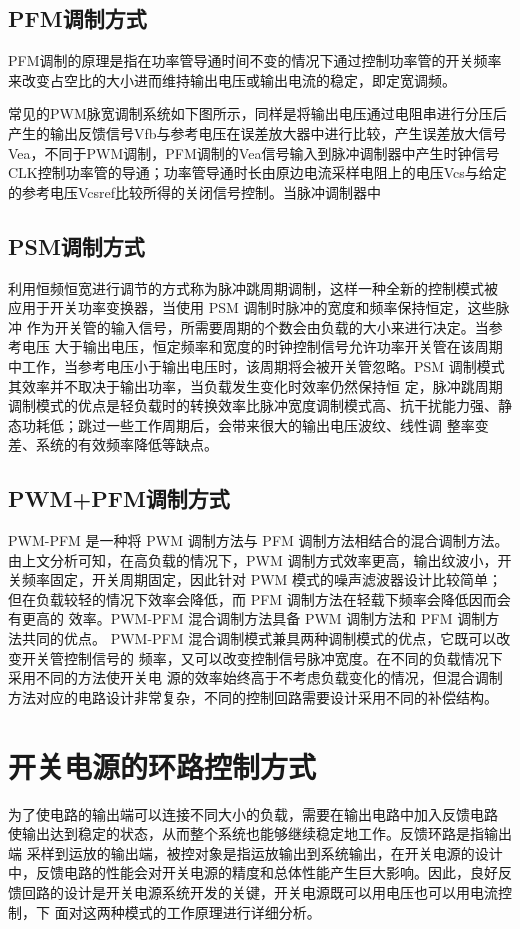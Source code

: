 \subsection{PFM调制方式}
PFM调制的原理是指在功率管导通时间不变的情况下通过控制功率管的开关频率来改变占空比的大小进而维持输出电压或输出电流的稳定，即定宽调频。

常见的PWM脉宽调制系统如下图所示，同样是将输出电压通过电阻串进行分压后产生的输出反馈信号Vfb与参考电压在误差放大器中进行比较，产生误差放大信号Vea，不同于PWM调制，PFM调制的Vea信号输入到脉冲调制器中产生时钟信号CLK控制功率管的导通；功率管导通时长由原边电流采样电阻上的电压Vcs与给定的参考电压Vcsref比较所得的关闭信号控制。当脉冲调制器中
\subsection{PSM调制方式}
利用恒频恒宽进行调节的方式称为脉冲跳周期调制，这样一种全新的控制模式被 应用于开关功率变换器，当使用 PSM 调制时脉冲的宽度和频率保持恒定，这些脉冲 作为开关管的输入信号，所需要周期的个数会由负载的大小来进行决定。当参考电压 大于输出电压，恒定频率和宽度的时钟控制信号允许功率开关管在该周期中工作，当参考电压小于输出电压时，该周期将会被开关管忽略。PSM 调制模式其效率并不取决于输出功率，当负载发生变化时效率仍然保持恒 定，脉冲跳周期调制模式的优点是轻负载时的转换效率比脉冲宽度调制模式高、抗干扰能力强、静态功耗低；跳过一些工作周期后，会带来很大的输出电压波纹、线性调 整率变差、系统的有效频率降低等缺点。
\subsection{PWM+PFM调制方式}
PWM-PFM 是一种将 PWM 调制方法与 PFM 调制方法相结合的混合调制方法。 由上文分析可知，在高负载的情况下，PWM 调制方式效率更高，输出纹波小，开关频率固定，开关周期固定，因此针对 PWM 模式的噪声滤波器设计比较简单；但在负载较轻的情况下效率会降低，而 PFM 调制方法在轻载下频率会降低因而会有更高的 效率。PWM-PFM 混合调制方法具备 PWM 调制方法和 PFM 调制方法共同的优点。 PWM-PFM 混合调制模式兼具两种调制模式的优点，它既可以改变开关管控制信号的 频率，又可以改变控制信号脉冲宽度。在不同的负载情况下采用不同的方法使开关电 源的效率始终高于不考虑负载变化的情况，但混合调制方法对应的电路设计非常复杂，不同的控制回路需要设计采用不同的补偿结构。

\section{开关电源的环路控制方式}
为了使电路的输出端可以连接不同大小的负载，需要在输出电路中加入反馈电路 使输出达到稳定的状态，从而整个系统也能够继续稳定地工作。反馈环路是指输出端 采样到运放的输出端，被控对象是指运放输出到系统输出，在开关电源的设计中，反馈电路的性能会对开关电源的精度和总体性能产生巨大影响。因此，良好反馈回路的设计是开关电源系统开发的关键，开关电源既可以用电压也可以用电流控制，下 面对这两种模式的工作原理进行详细分析。

